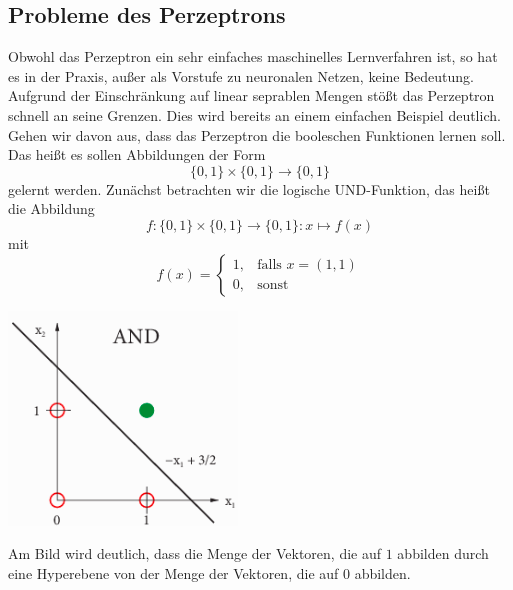 \documentclass[fontsize=11pt]{scrartcl}
\newenvironment{Figure}
  {\par\medskip\noindent\minipage{\linewidth}}
  {\endminipage\par\medskip}
\begin{document}
                \subsection{Probleme des Perzeptrons}
                        Obwohl das Perzeptron ein sehr einfaches maschinelles Lernverfahren ist, so hat es in der Praxis, außer als Vorstufe zu neuronalen Netzen, keine Bedeutung. Aufgrund der Einschränkung auf linear seprablen Mengen stößt das Perzeptron schnell an seine Grenzen.
                        Dies wird bereits an einem einfachen Beispiel deutlich.
                        \newline
                        Gehen wir davon aus, dass das Perzeptron die booleschen Funktionen lernen soll. Das heißt es sollen Abbildungen der Form $$\{0,1\}\times\{0,1\} \rightarrow \{0,1\}$$ gelernt werden.
                        Zunächst betrachten wir die logische UND-Funktion, das heißt die Abbildung
                        $$
                            f:\{0,1\}\times\{0,1\}\rightarrow\{0,1\}: x\mapsto f(x)
                        $$
                        mit
                        $$
                            f(x)=\left\{\begin{array}{cl} 1, & \mbox{falls }x=(1,1)\\
                            0, & \mbox{sonst}\end{array}\right. 
                        $$
                        \begin{Figure}
                            \centering
                            \includegraphics[scale=0.5]{AND.png}
                        \end{Figure}
                        Am Bild wird deutlich, dass die Menge der Vektoren, die auf $1$ abbilden durch eine Hyperebene von der Menge der Vektoren, die auf $0$ abbilden.
\end{document}

